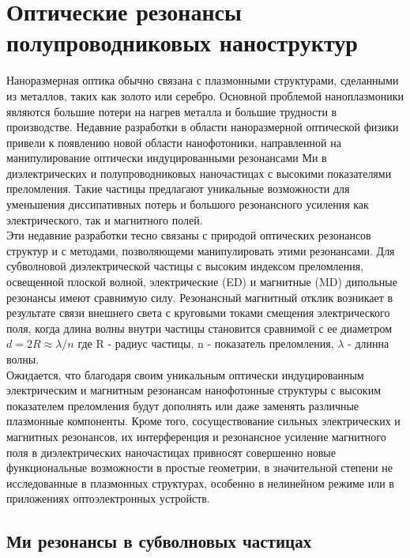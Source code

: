 \section{Оптические резонансы полупроводниковых наноструктур}
\hspace*{2mm}
Наноразмерная оптика обычно связана с плазмонными структурами, сделанными из металлов, таких как золото или серебро. Основной проблемой наноплазмоники являются большие потери на нагрев металла и большие трудности в производстве. Недавние разработки в области наноразмерной оптической физики привели к появлению новой области нанофотоники, направленной на манипулирование оптически индуцированными резонансами Ми в диэлектрических и полупроводниковых наночастицах с высокими показателями преломления. Такие частицы предлагают уникальные возможности для уменьшения диссипативных потерь и большого резонансного усиления как электрического, так и магнитного полей. 
\\
\hspace*{2mm}
Эти недавние разработки тесно связаны с природой оптических резонансов структур и с методами, позволяющеми манипулировать этими резонансами. Для субволновой диэлектрической частицы с высоким индексом преломления, освещенной плоской волной, электрические (ED) и магнитные (MD) дипольные резонансы имеют сравнимую силу. Резонансный магнитный отклик возникает в результате связи внешнего света с круговыми токами смещения электрического поля, когда длина волны внутри частицы становится сравнимой с ее диаметром $d = 2R \approx \lambda/n$ где R - радиус частицы, n - показатель преломления, $\lambda$ - длинна волны.
\\
\hspace*{2mm}
Ожидается, что благодаря своим уникальным оптически индуцированным электрическим и магнитным резонансам нанофотонные структуры с высоким показателем преломления будут дополнять или даже заменять различные плазмонные компоненты. Кроме того, сосуществование сильных электрических и магнитных резонансов, их интерференция и резонансное усиление магнитного поля в диэлектрических наночастицах привносят совершенно новые функциональные возможности в простые геометрии, в значительной степени не исследованные в плазмонных структурах, особенно в нелинейном режиме или в приложениях оптоэлектронных устройств. 

\subsection*{Ми резонансы в субволновых частицах}

